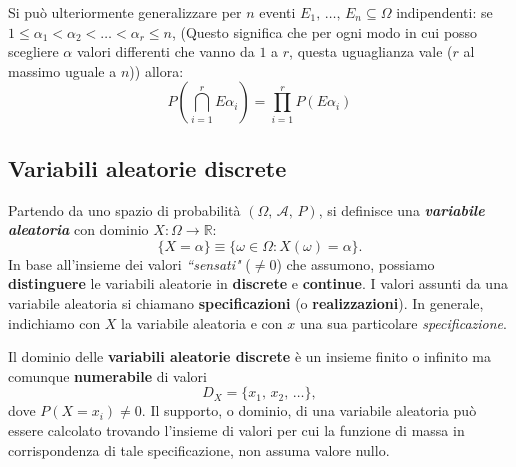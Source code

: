 \noindent Si può ulteriormente generalizzare per $n$ eventi $E_1, \, \dots, \, E_n \subseteq \Omega$ indipendenti: se $1 \leq \alpha_1 < \alpha_2 < \dots < \alpha_r \leq n$,
(Questo significa che per ogni modo in cui posso scegliere $\alpha$ valori differenti che vanno da $1$ a $r$, questa uguaglianza vale ($r$ al massimo uguale a $n$))
allora:
\[
P \left (\bigcap_{i=1}^r E{\alpha_i} \right ) = \prod_{i=1}^r P(E{\alpha_i})
\]



\subsection{Variabili aleatorie discrete}
Partendo da uno spazio di probabilità $(\Omega, \, \mathcal A, \, P)$, si definisce una \textbf{\textit{variabile aleatoria}} con dominio $X: \Omega \rightarrow \mathbb R$: \[
\boxed{
\{ X = \alpha \} \equiv \{ \omega \in \Omega : X(\omega) = \alpha \}
}.
\]
\noindent In base all'insieme dei valori \textit{``sensati"} ($\neq 0$) che assumono, possiamo \textbf{distinguere} le variabili aleatorie in \textbf{discrete} e \textbf{continue}. 
I valori assunti da una variabile aleatoria si chiamano \textbf{specificazioni} (o \textbf{realizzazioni}). 
In generale, indichiamo con $X$ la variabile aleatoria e con $x$ una sua particolare \textit{specificazione}.

\noindent Il dominio delle \textbf{variabili aleatorie discrete} è un insieme finito o infinito ma comunque \textbf{numerabile} di valori \[D_X = \{ x_1, \, x_2, \, \dots \},\]
dove $P(X = x_i) \neq 0$. Il supporto, o dominio, di una variabile aleatoria può essere calcolato trovando l'insieme di valori per cui la funzione di massa in corrispondenza di tale specificazione, non assuma valore nullo.

